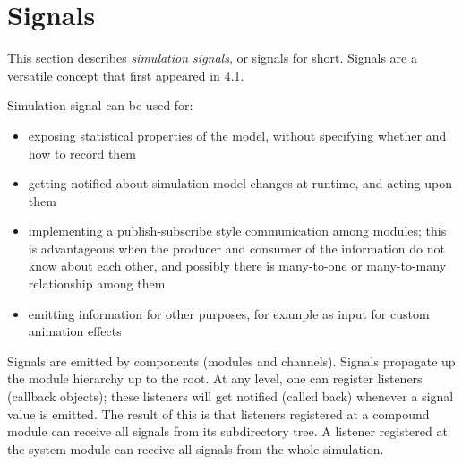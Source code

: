 
\section{Signals}
\label{sec:simple-modules:signals}

This section describes \textit{simulation signals}, or signals for short.
Signals are a versatile concept that first appeared in {\opp} 4.1.

Simulation signal can be used for:

\begin{itemize}
  \item{exposing statistical properties of the model, without specifying
        whether and how to record them}
  \item{getting notified about simulation model changes at runtime, and
        acting upon them}
  \item{implementing a publish-subscribe style communication among modules;
        this is advantageous when the producer and consumer of the information
        do not know about each other, and possibly there is many-to-one or
        many-to-many relationship among them}
  \item{emitting information for other purposes, for example as input for
        custom animation effects}
\end{itemize}

Signals are emitted by components (modules and channels). Signals propagate
up the module hierarchy up to the root. At any level, one can register
listeners (callback objects); these listeners will get notified (called back)
whenever a signal value is emitted. The result of this is that listeners
registered at a compound module can receive all signals from its subdirectory
tree. A listener registered at the system module can receive all signals from
the whole simulation.

